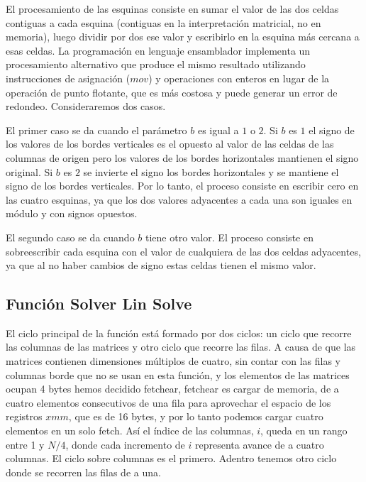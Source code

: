 \par El procesamiento de las esquinas consiste en sumar el valor de las dos celdas contiguas a cada esquina (contiguas en la interpretación matricial, no en memoria), luego dividir por dos ese valor y escribirlo en la esquina más cercana a esas celdas. La programación en lenguaje ensamblador implementa un procesamiento alternativo que produce el mismo resultado utilizando instrucciones de asignación ($mov$) y operaciones con enteros en lugar de la operación de punto flotante, que es más costosa y puede generar un error de redondeo. Consideraremos dos casos.\newline
\par El primer caso se da cuando el parámetro $b$ es igual a $1$ o $2$. Si $b$ es $1$ el signo de los valores de los bordes verticales es el opuesto al valor de las celdas de las columnas de origen pero los valores de los bordes horizontales mantienen el signo original. Si $b$ es $2$ se invierte el signo los bordes horizontales y se mantiene el signo de los bordes verticales. Por lo tanto, el proceso consiste en escribir cero en las cuatro esquinas, ya que los dos valores adyacentes a cada una son iguales en módulo y con signos opuestos.\newline
\par El segundo caso se da cuando $b$ tiene otro valor. El proceso consiste en sobreescribir cada esquina con el valor de cualquiera de las dos celdas adyacentes, ya que al no haber cambios de signo estas celdas tienen el mismo valor.\newline

\subsection{Función Solver Lin Solve}
\par El ciclo principal de la función está formado por dos ciclos: un ciclo que recorre las columnas de las matrices y otro ciclo que recorre las filas. A causa de que las matrices contienen dimensiones múltiplos de cuatro, sin contar con las filas y columnas borde que no se usan en esta función, y los elementos de las matrices ocupan 4 bytes hemos decidido fetchear, fetchear es cargar de memoria, de a cuatro elementos consecutivos de una fila para aprovechar el espacio de los registros $xmm$, que es de 16 bytes, y por lo tanto podemos cargar cuatro elementos en un solo fetch. Así el índice de
las columnas, $i$, queda en un rango entre 1 y $N/4$, donde cada incremento de $i$ representa avance de a cuatro columnas. El ciclo sobre columnas es el primero. Adentro tenemos otro ciclo donde se recorren las filas de a una. \newline


